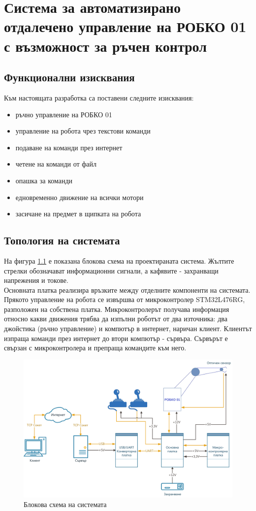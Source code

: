 \chapter{Система за автоматизирано отдалечено управление на РОБКО 01 с
възможност за ръчен контрол}
\section{Функционални изисквания}
Към настоящата разработка са поставени следните изисквания:
\begin{itemize}
    \item ръчно управление на РОБКО 01
    \item управление на робота чрез текстови команди
    \item подаване на команди през интернет
    \item четене на команди от файл
    \item опашка за команди
    \item едновременно движение на всички мотори
    \item засичане на предмет в щипката на робота
\end{itemize}
\section{Топология на системата}
На фигура \ref{fig:system} е показана блокова схема на проектираната система. Жълтите стрелки обозначават информационни сигнали, а кафявите - захранващи напрежения и токове.\\
\indent{}
Основната платка реализира връзките между отделните компоненти на системата. Прякото управление на робота се извършва от микроконтролер STM32L476RG, разположен на собствена платка. Микроконтролерът получава информация относно какви движения трябва да изпълни роботът от два източника: два джойстика (ръчно управление) и компютър в интернет, наричан клиент. Клиентът изпраща команди през интернет до втори компютър - сървъра. Сървърът е свързан с микроконтролера и препраща командите към него.\\
\indent{}
\begin{figure}[!htbp]
    \centering
    \includegraphics[angle=90,origin=center,width=\linewidth]{pictures/robko_system_diagram.png}
    \caption{Блокова схема на системата}
    \label{fig:system}
\end{figure}
